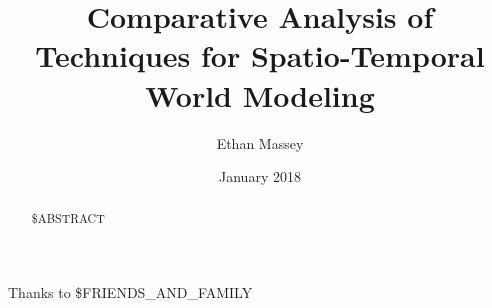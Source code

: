 \documentclass[thesis]{mas_report}
\author{Ethan Massey}
\title{Comparative Analysis of Techniques for Spatio-Temporal World Modeling}
\date{January 2018}
\begin{document}
\begin{titlepage}
    \maketitle
\end{titlepage}


\pagestyle{plain}


\cleardoublepage
\statementpage

\begin{abstract}
  \$ABSTRACT
\end{abstract}


\begin{acknowledgements}
  Thanks to \$FRIENDS\_AND\_FAMILY
\end{acknowledgements}


\tableofcontents
\listoffigures
\listoftables


\mainmatter %

\pagestyle{mainmatter}











\begin{appendices}


\end{appendices}

\backmatter


\nocite{*}
\end{document}
